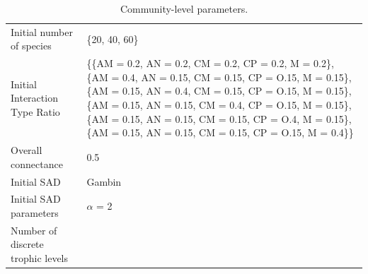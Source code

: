 \begin{longtable}[]{@{}ll@{}}
\caption[Model community parameters]{\color{Gray}Community-level parameters.}
\label{tab:tableApp3.1.1}\\
\toprule
\begin{minipage}[t]{0.39\columnwidth}\raggedright\strut
Initial number of species\strut
\end{minipage} & \begin{minipage}[t]{0.55\columnwidth}\raggedright\strut
\{20, 40, 60\}\strut
\end{minipage}\tabularnewline
\begin{minipage}[t]{0.39\columnwidth}\raggedright\strut
Initial Interaction Type Ratio\strut
\end{minipage} & \begin{minipage}[t]{0.55\columnwidth}\raggedright\strut
\{\{AM = 0.2, AN = 0.2, CM = 0.2, CP = 0.2, M = 0.2\}, \{AM = 0.4, AN =
0.15, CM = 0.15, CP = O.15, M = 0.15\}, \{AM = 0.15, AN = 0.4, CM =
0.15, CP = O.15, M = 0.15\}, \{AM = 0.15, AN = 0.15, CM = 0.4, CP =
O.15, M = 0.15\}, \{AM = 0.15, AN = 0.15, CM = 0.15, CP = O.4, M =
0.15\}, \{AM = 0.15, AN = 0.15, CM = 0.15, CP = O.15, M = 0.4\}\}\strut
\end{minipage}\tabularnewline
\begin{minipage}[t]{0.39\columnwidth}\raggedright\strut
Overall connectance\strut
\end{minipage} & \begin{minipage}[t]{0.55\columnwidth}\raggedright\strut
0.5\strut
\end{minipage}\tabularnewline
\begin{minipage}[t]{0.39\columnwidth}\raggedright\strut
Initial SAD\strut
\end{minipage} & \begin{minipage}[t]{0.55\columnwidth}\raggedright\strut
Gambin\strut
\end{minipage}\tabularnewline
\begin{minipage}[t]{0.39\columnwidth}\raggedright\strut
Initial SAD parameters\strut
\end{minipage} & \begin{minipage}[t]{0.55\columnwidth}\raggedright\strut
\(\alpha\) = 2\strut
\end{minipage}\tabularnewline
\begin{minipage}[t]{0.39\columnwidth}\raggedright\strut
Number of discrete trophic levels\strut
\end{minipage} & \begin{minipage}[t]{0.55\columnwidth}\raggedright\strut

\end{minipage}
\end{longtable}
